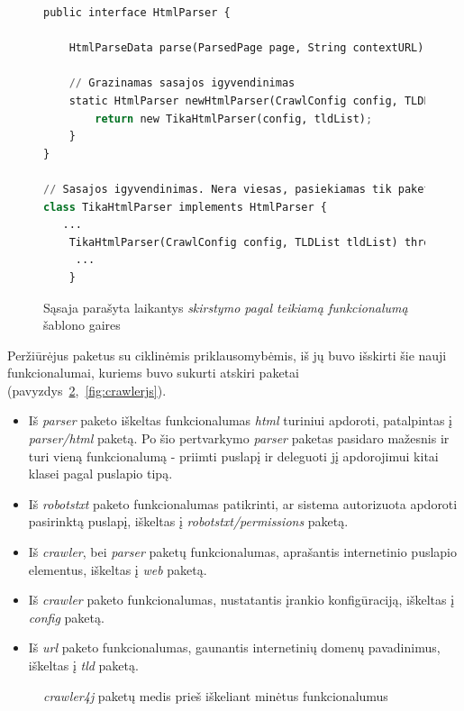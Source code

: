 \begin{figure}[H]
    \begin{lstlisting}[language=Python]
public interface HtmlParser {

    HtmlParseData parse(ParsedPage page, String contextURL) throws ParseException;

    // Grazinamas sasajos igyvendinimas
    static HtmlParser newHtmlParser(CrawlConfig config, TLDList tldList) throws InstantiationException, IllegalAccessException {
        return new TikaHtmlParser(config, tldList);
    }
}

// Sasajos igyvendinimas. Nera viesas, pasiekiamas tik paketo viduje, nes klase ir konstruktorius nenaudoja public raktazodziu
class TikaHtmlParser implements HtmlParser {
   ...
    TikaHtmlParser(CrawlConfig config, TLDList tldList) throws InstantiationException, IllegalAccessException {
     ...
    }
    \end{lstlisting}
    \caption{Sąsaja parašyta laikantys \textit{skirstymo pagal teikiamą funkcionalumą} šablono gaires}
    \label{fig:sasaja}
\end{figure}
Peržiūrėjus paketus su ciklinėmis priklausomybėmis, iš jų buvo išskirti šie nauji funkcionalumai, kuriems
buvo sukurti atskiri paketai (pavyzdys~\ref{fig:crawlerj},~\ref{fig:crawlerjs}).
\begin{itemize}
    \item Iš \textit{parser} paketo iškeltas funkcionalumas \textit{html} turiniui apdoroti, patalpintas į \textit{parser/html} paketą.
    Po šio pertvarkymo \textit{parser} paketas pasidaro mažesnis ir turi vieną funkcionalumą - priimti puslapį ir deleguoti jį apdorojimui kitai klasei pagal puslapio tipą.
    \item Iš \textit{robotstxt} paketo funkcionalumas patikrinti, ar sistema autorizuota apdoroti pasirinktą puslapį, iškeltas į \textit{robotstxt/permissions} paketą.
    \item Iš \textit{crawler}, bei \textit{parser} paketų funkcionalumas, aprašantis internetinio puslapio elementus, iškeltas į \textit{web} paketą.
    \item Iš \textit{crawler} paketo funkcionalumas, nustatantis įrankio konfigūraciją, iškeltas į \textit{config} paketą.
    \item Iš \textit{url} paketo funkcionalumas, gaunantis internetinių domenų pavadinimus, iškeltas į \textit{tld} paketą.
\end{itemize}

\begin{figure}[H]
    \snugshade
    \endsnugshade
    \caption{\textit{crawler4j} paketų medis prieš iškeliant minėtus funkcionalumus}
    \label{fig:crawlerj}
\end{figure}

